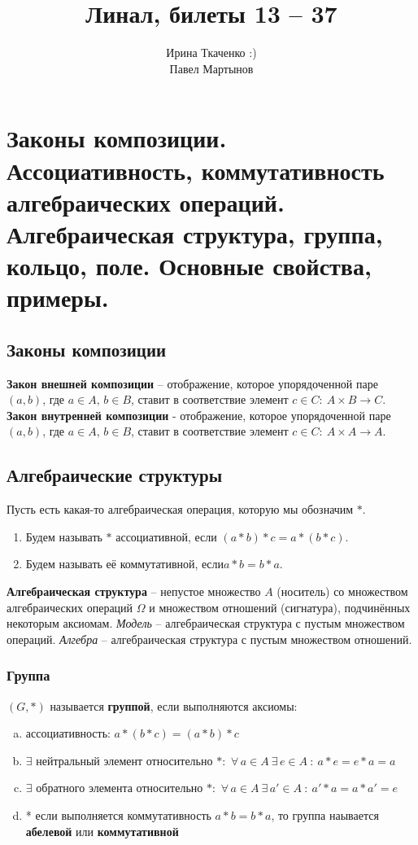 \documentclass{article}
\title{Линал, билеты 13 -- 37}
\author{Ирина Ткаченко :)\\ %
			Павел Мартынов}
\date{}
\begin{document}
\maketitle 
\tableofcontents

\newpage
\section{Законы композиции. Ассоциативность, коммутативность алгебраических операций. Алгебраическая структура, группа, кольцо, поле. Основные свойства, примеры.}
\subsection{Законы композиции}
\textbf{Закон внешней композиции} -- отображение, которое упорядоченной паре $(a, b)$, где
$a \in A,\,b \in B$, ставит в соответствие элемент $c\in C :\: A \times B \to C$.
\newline
\newline
\textbf{Закон внутренней композиции} - отображение, которое упорядоченной паре $(a, b)$, где
$a \in A,\,b \in B$, ставит в соответствие элемент $c\in C :\: A \times A \to A$.
\newline
\newline
\subsection{Алгебраические структуры}
Пусть есть какая-то алгебраическая операция, которую мы обозначим $*$. 
\begin{enumerate}
    \item Будем называть $*$ ассоциативной, если $(a*b)*c = a*(b*c)$.
    \item Будем называть её коммутативной, $если a*b = b*a$.
\end{enumerate}
\textbf{Алгебраическая структура} -- непустое множество $A$ (носитель) со множеством алгебраических операций $\Omega$ и множеством отношений (сигнатура), подчинённых некоторым аксиомам. \textit{Модель} -- алгебраическая структура с пустым множеством операций. \textit{Алгебра} -- алгебраическая структура с пустым множеством отношений.
\subsubsection{Группа} 
$(G,*)$ называется \textbf{группой}, если выполняются аксиомы:
    \begin{enumerate}[(a)]
        \item ассоциативность: $a*(b*c)=(a*b)*c$
        \item $\exists$ нейтральный элемент относительно $*$: $\,\forall\,a\in A\:\exists\,e\in A\::\:a*e=e*a=a$
        \item $\exists$ обратного элемента относительно $*$: $\,\forall\,a\in A\:\exists\,a'\in A\::\:a'*a=a*a'=e$
        \item * если выполняется коммутативность $a*b=b*a$, то группа наывается \textbf{абелевой} или \textbf{коммутативной}
    \end{enumerate}
    \newpage
\end{document}
